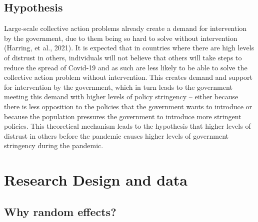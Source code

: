 \documentclass[
  11pt,
]{article}
\begin{document}
\hypertarget{hypothesis}{%
\subsection{Hypothesis}\label{hypothesis}}

Large-scale collective action problems already create a demand for intervention by the government, due to them being so hard to solve without intervention (Harring, et al., 2021). It is expected that in countries where there are high levels of distrust in others, individuals will not believe that others will take steps to reduce the spread of Covid-19 and as such are less likely to be able to solve the collective action problem without intervention. This creates demand and support for intervention by the government, which in turn leads to the government meeting this demand with higher levels of policy stringency -- either because there is less opposition to the policies that the government wants to introduce or because the population pressures the government to introduce more stringent policies. This theoretical mechanism leads to the hypothesis that higher levels of distrust in others before the pandemic causes higher levels of government stringency during the pandemic.\\

\hypertarget{research-design-and-data}{%
\section{Research Design and data}\label{research-design-and-data}}

\hypertarget{why-random-effects}{%
\subsection{Why random effects?}\label{why-random-effects}}
\end{document}
